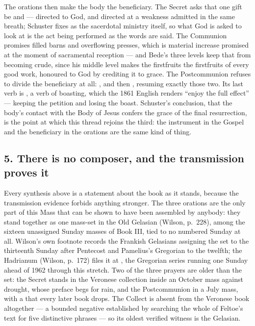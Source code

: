 The orations then make the body the beneficiary. The Secret asks that one gift
be  and  ---
directed to God, and directed at a weakness admitted in the same breath;
Schuster fixes  as the sacerdotal ministry itself, so what
God is asked to look at is the act being performed as the words are said. The
Communion promises filled barns and overflowing presses, which is material
increase promised at the moment of sacramental reception --- and Bede's three
levels keep that from becoming crude, since his middle level makes the
firstfruits the firstfruits of every good work, honoured to God by crediting it
to grace. The Postcommunion refuses to divide the beneficiary at all:
, and then ,
resuming exactly those two. Its last verb is , a verb of
boasting, which the 1861 English renders ``enjoy the full effect'' --- keeping
the petition and losing the boast. Schuster's conclusion, that the body's
contact with the Body of Jesus confers the grace of the final resurrection, is
the point at which this thread rejoins the third: the instrument in the Gospel
and the beneficiary in the orations are the same kind of thing.

\subsection*{5. There is no composer, and the transmission proves it}

Every synthesis above is a statement about the book as it stands, because the
transmission evidence forbids anything stronger. The three orations are the only
part of this Mass that can be shown to have been assembled by anybody: they
stand together as one mass-set in the Old Gelasian (Wilson, p.~228), among the
sixteen unassigned Sunday masses of Book III, tied to no numbered Sunday at
all. Wilson's own footnote records the Frankish Gelasians assigning the set to
the thirteenth Sunday after Pentecost and Pamelius's Gregorian to the twelfth;
the Hadrianum (Wilson, p.~172) files it at , the Gregorian series running one Sunday ahead of 1962 through
this stretch. Two of the three prayers are older than the set: the Secret
stands in the Veronese collection inside an October mass against drought, whose
preface begs for rain, and the Postcommunion in a July mass, with a
 that every later book drops. The Collect is absent from the Veronese
book altogether --- a bounded negative established by searching the whole of
Feltoe's text for five distinctive phrases --- so its oldest verified witness is
the Gelasian.


